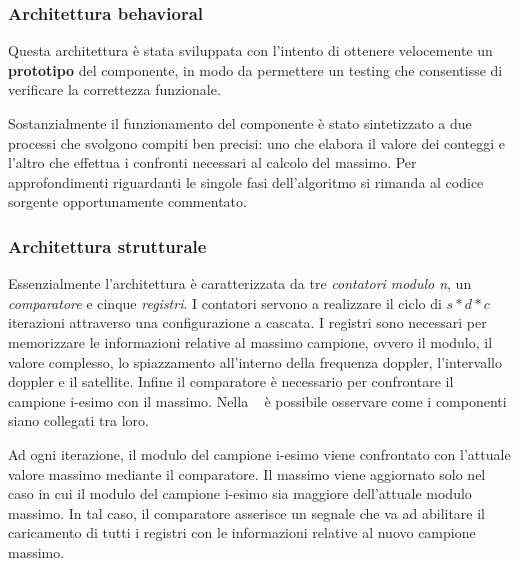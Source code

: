 \documentclass[12pt,a4paper,twoside,openany]{book}
\begin{document}
\subsubsection{Architettura behavioral}
Questa architettura è stata sviluppata con l'intento di ottenere velocemente un \textbf{prototipo} del componente, in modo da permettere un testing che consentisse di verificare la correttezza funzionale.

Sostanzialmente il funzionamento del componente è stato sintetizzato a due processi che svolgono compiti ben precisi: uno che elabora il valore dei conteggi e l'altro che effettua i confronti necessari al calcolo del massimo. Per approfondimenti riguardanti le singole fasi dell'algoritmo si rimanda al codice sorgente opportunamente commentato.


\subsubsection{Architettura strutturale}
Essenzialmente l'architettura è caratterizzata da tre \textit{contatori modulo n}, un \textit{comparatore} e cinque \textit{registri}. I contatori servono a realizzare il ciclo di $s*d*c$ iterazioni attraverso una configurazione a cascata. I registri sono necessari per memorizzare le informazioni relative al massimo campione, ovvero il modulo, il valore complesso, lo spiazzamento all'interno della frequenza doppler, l'intervallo doppler e il satellite. Infine il comparatore è necessario per confrontare il campione i-esimo con il massimo. Nella \figurename~ è possibile osservare come i componenti siano collegati tra loro.


Ad ogni iterazione, il modulo del campione i-esimo viene confrontato con l'attuale valore massimo mediante il comparatore. Il massimo viene aggiornato solo nel caso in cui il modulo del campione i-esimo sia maggiore dell'attuale modulo massimo. In tal caso, il comparatore asserisce un segnale che va ad abilitare il caricamento di tutti i registri con le informazioni relative al nuovo campione massimo.
\end{document}
